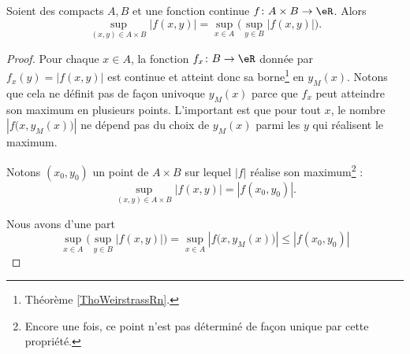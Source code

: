 \begin{lemma}       \label{LEMooQLVAooICaPvR}
	Soient des compacts \( A,B\) et une fonction continue \( f\colon A\times B\to \eR\). Alors
	\begin{equation}
		\sup_{(x,y)\in A\times B}| f(x,y) |=\sup_{x\in A}\big( \sup_{y\in B}| f(x,y) | \big).
	\end{equation}
\end{lemma}

\begin{proof}
	Pour chaque \( x\in A \), la fonction \( f_x\colon B\to \eR\) donnée par \( f_x(y)=| f(x,y) |\) est continue et atteint donc sa borne\footnote{Théorème \ref{ThoWeirstrassRn}.} en \( y_M(x)\). Notons que cela ne définit pas de façon univoque \( y_M(x)\) parce que \( f_x\) peut atteindre son maximum en plusieurs points. L'important est que pour tout \( x\), le nombre \( | f\big( x,y_M(x) \big) |\) ne dépend pas du choix de \( y_M(x)\) parmi les \( y\) qui réalisent le maximum.


	Notons \( (x_0,y_0)\) un point de \( A\times B\) sur lequel \( | f |\) réalise son maximum\footnote{Encore une fois, ce point n'est pas déterminé de façon unique par cette propriété.} :
	\begin{equation}        \label{EQooDDXDooVsnlKG}
		\sup_{(x,y)\in A\times B}| f(x,y) |=| f(x_0,y_0) |.
	\end{equation}


	Nous avons d'une part
	\begin{equation}
		\sup_{x\in A}\big( \sup_{y\in B}| f(x,y) | \big)=\sup_{x\in A}| f\big( x,y_M(x) \big) |\leq | f(x_0,y_0) |
	\end{equation}


\end{proof}
